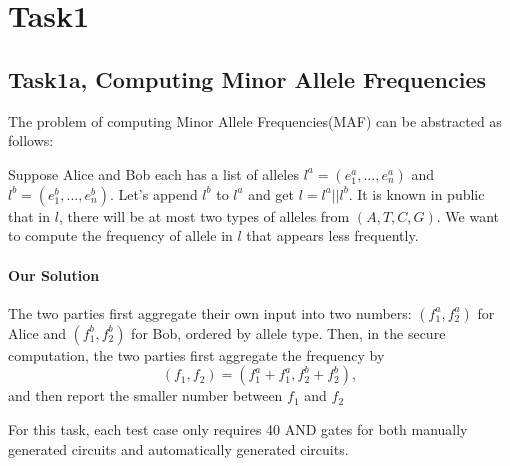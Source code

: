 \section{Task1}
\subsection{Task1a, Computing Minor Allele Frequencies}
The problem of computing Minor Allele Frequencies(MAF) can be abstracted as follows:

Suppose Alice and Bob each has a list of alleles $l^a = (e^a_1,...,e^a_n)$ and $l^b = (e^b_1,...,e^b_n)$.
Let's append $l^b$ to $l^a$ and get $l = l^a || l^b$. It is known in public that in $l$, there will be at most two types of
alleles from $(A,T,C,G)$. We want to compute the frequency of allele in $l$ that appears less frequently.

\paragraph{Our Solution}
The two parties first aggregate their own input into two numbers: $(f^a_1, f^a_2)$ for Alice and $(f^b_1,f^b_2)$ for Bob, ordered by allele type.
Then, in the secure computation, the two parties first aggregate the frequency by
$$(f_1, f_2) = (f^a_1+f^a_1, f^b_2+f^b_2),$$
and then report the smaller number between $f_1$ and $f_2$

For this task, each test case only requires 40 AND gates for both manually generated circuits and automatically generated circuits.

